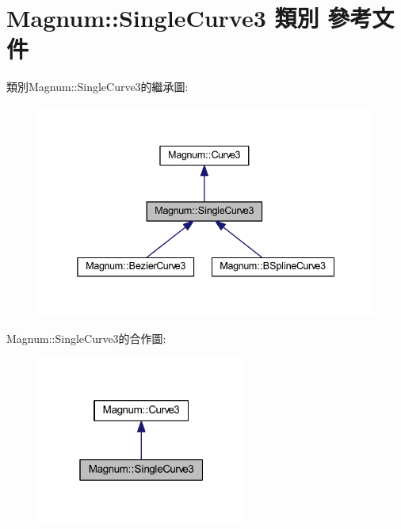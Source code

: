 \hypertarget{class_magnum_1_1_single_curve3}{}\section{Magnum\+:\+:Single\+Curve3 類別 參考文件}
\label{class_magnum_1_1_single_curve3}


類別\+Magnum\+:\+:Single\+Curve3的繼承圖\+:\nopagebreak
\begin{figure}[H]
\begin{center}
\leavevmode
\includegraphics[width=338pt]{class_magnum_1_1_single_curve3__inherit__graph}
\end{center}
\end{figure}


Magnum\+:\+:Single\+Curve3的合作圖\+:\nopagebreak
\begin{figure}[H]
\begin{center}
\leavevmode
\includegraphics[width=196pt]{class_magnum_1_1_single_curve3__coll__graph}
\end{center}
\end{figure}
